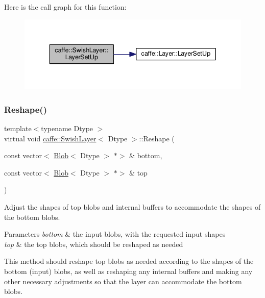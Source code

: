 Here is the call graph for this function\+:
\nopagebreak
\begin{figure}[H]
\begin{center}
\leavevmode
\includegraphics[width=343pt]{classcaffe_1_1_swish_layer_a35bd01fae515cb064107c621a3c12820_cgraph}
\end{center}
\end{figure}
\mbox{\label{classcaffe_1_1_swish_layer_aecf840a1202549b60742eb11a2f188ee}} 
\subsubsection{\texorpdfstring{Reshape()}{Reshape()}\hspace{0.1cm}{\footnotesize\ttfamily [1/2]}}
{\footnotesize\ttfamily template$<$typename Dtype $>$ \\
virtual void \mbox{\hyperlink{classcaffe_1_1_swish_layer}{caffe\+::\+Swish\+Layer}}$<$ Dtype $>$\+::Reshape (\begin{DoxyParamCaption}\item[{const vector$<$ \mbox{\hyperlink{classcaffe_1_1_blob}{Blob}}$<$ Dtype $>$ $\ast$$>$ \&}]{bottom,  }\item[{const vector$<$ \mbox{\hyperlink{classcaffe_1_1_blob}{Blob}}$<$ Dtype $>$ $\ast$$>$ \&}]{top }\end{DoxyParamCaption})\hspace{0.3cm}{\ttfamily [virtual]}}



Adjust the shapes of top blobs and internal buffers to accommodate the shapes of the bottom blobs. 


\begin{DoxyParams}{Parameters}
{\em bottom} & the input blobs, with the requested input shapes \\
\hline
{\em top} & the top blobs, which should be reshaped as needed\\
\hline
\end{DoxyParams}
This method should reshape top blobs as needed according to the shapes of the bottom (input) blobs, as well as reshaping any internal buffers and making any other necessary adjustments so that the layer can accommodate the bottom blobs. 

